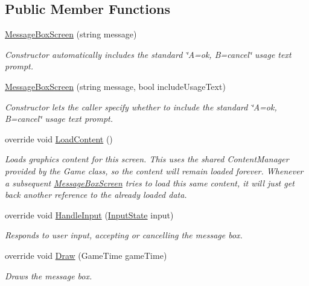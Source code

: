 \subsection*{Public Member Functions}
\begin{DoxyCompactItemize}
\item 
\hyperlink{classCityMania_1_1MessageBoxScreen_aa0d3535d7f9fe9319a6d4194d20fb5ad}{MessageBoxScreen} (string message)
\begin{DoxyCompactList}\small\item\em Constructor automatically includes the standard \char`\"{}A=ok, B=cancel\char`\"{} usage text prompt. \item\end{DoxyCompactList}\item 
\hyperlink{classCityMania_1_1MessageBoxScreen_a040e972bf8f7eff08ffaaa8ba5946537}{MessageBoxScreen} (string message, bool includeUsageText)
\begin{DoxyCompactList}\small\item\em Constructor lets the caller specify whether to include the standard \char`\"{}A=ok, B=cancel\char`\"{} usage text prompt. \item\end{DoxyCompactList}\item 
override void \hyperlink{classCityMania_1_1MessageBoxScreen_a0aa4e3fd4153ea36c090fbf7d2f428fe}{LoadContent} ()
\begin{DoxyCompactList}\small\item\em Loads graphics content for this screen. This uses the shared ContentManager provided by the Game class, so the content will remain loaded forever. Whenever a subsequent \hyperlink{classCityMania_1_1MessageBoxScreen}{MessageBoxScreen} tries to load this same content, it will just get back another reference to the already loaded data. \item\end{DoxyCompactList}\item 
override void \hyperlink{classCityMania_1_1MessageBoxScreen_ac6d8b1716a1976f8769276ab078fed90}{HandleInput} (\hyperlink{classCityMania_1_1InputState}{InputState} input)
\begin{DoxyCompactList}\small\item\em Responds to user input, accepting or cancelling the message box. \item\end{DoxyCompactList}\item 
override void \hyperlink{classCityMania_1_1MessageBoxScreen_a180792261ea11fe8d33271cc3e7d3c1d}{Draw} (GameTime gameTime)
\begin{DoxyCompactList}\small\item\em Draws the message box. \item\end{DoxyCompactList}\end{DoxyCompactItemize}
